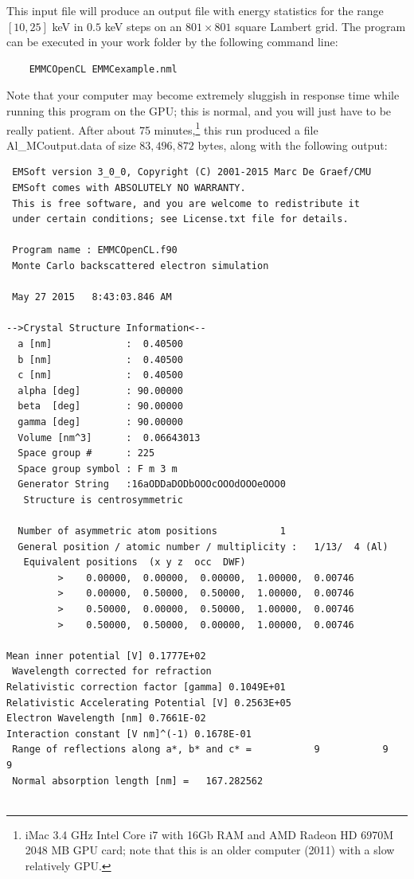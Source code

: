 \documentclass[DIV=calc, paper=letter, fontsize=11pt]{scrartcl}	 %
\begin{document}
This input file will produce an output file with energy statistics for the range $[10,25]$ keV in $0.5$ keV steps
on an $801\times 801$ square Lambert grid.  The program can be executed in your work folder by the following command line:
\begin{verbatim}
	EMMCOpenCL EMMCexample.nml
\end{verbatim}
Note that your computer may become extremely sluggish in response time while running this program on the GPU;
this is normal, and you will just have to be really patient.
After about 75 minutes,\footnote{iMac 3.4 GHz Intel Core i7 with 16Gb RAM and AMD Radeon HD 6970M 2048 MB GPU card; note that this is an older 
computer (2011) with a slow relatively GPU.} 
this run produced a file \textsf{Al\_MCoutput.data} of size $83,496,872$ bytes, along with the following output:
\begin{verbatim}
 EMSoft version 3_0_0, Copyright (C) 2001-2015 Marc De Graef/CMU
 EMSoft comes with ABSOLUTELY NO WARRANTY.
 This is free software, and you are welcome to redistribute it
 under certain conditions; see License.txt file for details.

 Program name : EMMCOpenCL.f90
 Monte Carlo backscattered electron simulation

 May 27 2015   8:43:03.846 AM

-->Crystal Structure Information<--
  a [nm]             :  0.40500
  b [nm]             :  0.40500
  c [nm]             :  0.40500
  alpha [deg]        : 90.00000
  beta  [deg]        : 90.00000
  gamma [deg]        : 90.00000
  Volume [nm^3]      :  0.06643013
  Space group #      : 225
  Space group symbol : F m 3 m
  Generator String   :16aODDaDODbOOOcOOOdOOOeOOO0
   Structure is centrosymmetric

  Number of asymmetric atom positions           1
  General position / atomic number / multiplicity :   1/13/  4 (Al)
   Equivalent positions  (x y z  occ  DWF)
         >    0.00000,  0.00000,  0.00000,  1.00000,  0.00746
         >    0.00000,  0.50000,  0.50000,  1.00000,  0.00746
         >    0.50000,  0.00000,  0.50000,  1.00000,  0.00746
         >    0.50000,  0.50000,  0.00000,  1.00000,  0.00746

Mean inner potential [V] 0.1777E+02
 Wavelength corrected for refraction
Relativistic correction factor [gamma] 0.1049E+01
Relativistic Accelerating Potential [V] 0.2563E+05
Electron Wavelength [nm] 0.7661E-02
Interaction constant [V nm]^(-1) 0.1678E-01
 Range of reflections along a*, b* and c* =           9           9           9
 Normal absorption length [nm] =   167.282562    


\end{verbatim}
\end{document}
